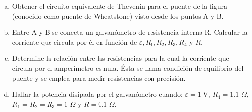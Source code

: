 \documentclass[problemas]{guia}
\begin{document}
\begin{problema}{}
    \begin{enumerate}[(a)]
        \item Obtener el circuito equivalente de Thevenin para el puente de la
            figura (conocido como puente de Wheatstone) visto desde los puntos 
            A y B.
        \item Entre A y B se conecta un galvanómetro de resistencia interna R.
            Calcular la corriente que circula por él en función de 
            $\varepsilon, R_1, R_2, R_3, R_4$ y $R$.
        \item Determine  la  relación  entre  las  resistencias  para  la cual
            la corriente que circula por el amperímetro es nula. Ésta se llama
            condición de equilibrio del puente y se emplea para medir 
            resistencias con precisión.
        \item Hallar  la  potencia  disipada  por  el  galvanómetro  cuando:
            $\varepsilon = 1$ V, $R_4 = 1.1$ $\Omega$, $R_1 = R_2 = R_3 = 1$ 
            $\Omega$  y $R = 0.1$ $\Omega$.
    \end{enumerate}
\end{problema}
\end{document}
